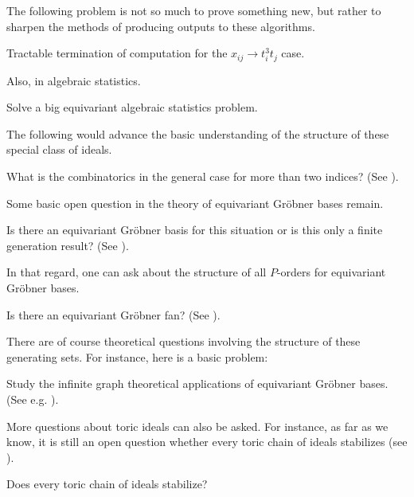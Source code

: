 
The following problem is not so much to prove something new, but rather to sharpen the methods of producing outputs to these algorithms.

\begin{problem}
Tractable termination of computation for the $x_{ij} \to t_i^3 t_j$ case.
\end{problem}

Also, in algebraic statistics.

\begin{problem}
Solve a big equivariant algebraic statistics problem.
\end{problem}


The following would advance the basic understanding of the structure of these special class of ideals.

\begin{problem}
What is the combinatorics in the general case for more than two indices?  (See \cite{KKL:equivariant-markov}).
\end{problem}

Some basic open question in the theory of equivariant Gr\"obner bases remain.

\begin{question}
Is there an equivariant Gr\"obner basis for this situation or is this only a finite generation result?  (See \cite{KKL:equivariant-markov, draisma2013noetherianity}).
\end{question}

In that regard, one can ask about the structure of all $P$-orders for equivariant Gr\"obner bases.  

\begin{question}
Is there an equivariant Gr\"obner fan?  (See \cite{sturmfels1996grobner}).
\end{question}

There are of course theoretical questions involving the structure of these generating sets.  For instance, here is a basic problem:

\begin{problem}
Study the infinite graph theoretical applications of equivariant Gr\"obner bases.  (See e.g. \cite{de2010recognizing}).
\end{problem}

More questions about toric ideals can also be asked.  For instance, as far as we know, it is still an open question whether every toric chain of ideals stabilizes (see \cite{Hillar13}).

\begin{question}
Does every toric chain of ideals stabilize?
\end{question}

